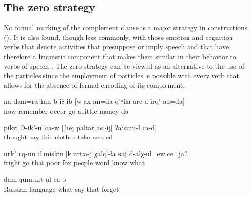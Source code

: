 
\subsection{The zero strategy}
\label{ssec:The zero strategy}

No formal marking of the complement clause is a major strategy in  constructions (). It is also found, though less commonly, with those emotion and cognition verbs that denote activities that presuppose or imply speech and that have therefore a linguistic component that makes them similar in their behavior to verbs of speech . The zero strategy can be viewed as an alternative to the use of the  particles since the employment of  particles is possible with every verb that allows for the absence of formal encoding of its complement.
%
\begin{exe}
	\ex	\label{ex:‎I also thought, I should go to make a little money}
	\gll	na	dam=ra	han	b-ič-ib	[w-ax-an=da	q'ʷila	arc	d-irq'-an=da]\\
		now		remember	occur	go	a.little	money	do\\
	\glt	{}

	\ex	\label{ex:‎He thinks, I need to take these clothes}
	\gll	pikri	Ø-ik'-ul	ca-w	[[hej	paltar	asː-ij]	ʡaˁʁuni-l	ca-d]\\
		thought	say		this	clothes	take	needed	\\
	\glt	{}

		\ex	\label{ex:‎‎‎The poor boy got frightened}
	\gll	urk'	uq-un	il	miskin	[kːurtːa-j	χalq'-la	ʁaj	d-alχ-ul=ew	ce=ja?]\\
		fright	go	that	poor	fox	people	word	know	what\\
	\glt	{}
	
	\ex	\label{ex:‎It is called something in Russian, I forgot}
	\gll	[ʡuˁrus	ʁaj-la	ce=jal	b-ik'-ul	ca-b	it-i-j]	dam	qum.urt-ul	ca-b\\
		Russian	language	what	say		that		forget-	\\
	\glt	{}
\end{exe}

